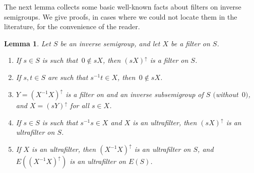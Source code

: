 \documentclass[a4paper,reqno,12pt]{amsart}
\numberwithin{equation}{section}
\theoremstyle{plain}
\newtheorem{lemma}[thm]{Lemma}
\theoremstyle{definition}
\begin{document}
The next lemma collects some basic well-known facts about filters on inverse semigroups. We give proofs, in cases where we could not locate them in the literature, for the convenience of the reader.

\begin{lemma} \label{idempt-filt-lem}
Let $S$ be an inverse semigroup, and let $X$ be a filter on $S$.
\begin{enumerate}[\upshape(1)]
\item If $s \in S$ is such that $\, 0 \notin sX$, then $(sX)^{\uparrow}$ is a filter on $S$.

\smallskip 

\item If $s,t \in S$ are such that $s^{-1}t \in X$, then $\, 0 \notin sX$.

\smallskip 

\item $Y = (X^{-1} X)^{\uparrow}$ is a filter on and an inverse subsemigroup of $S$ $($without $\, 0$$)$, and $X = (sY)^{\uparrow}$ for all $s \in X$.

\smallskip 

\item If $s \in S$ is such that $s^{-1}s \in X$ and $X$ is an ultrafilter, then $(sX)^{\uparrow}$ is an ultrafilter on $S$.

\smallskip 

\item If $X$ is an ultrafilter, then $(X^{-1} X)^{\uparrow}$ is an ultrafilter on $S$, and $E((X^{-1} X)^{\uparrow})$ is an ultrafilter on $E(S)$.
\end{enumerate}
\end{lemma}
\end{document}
